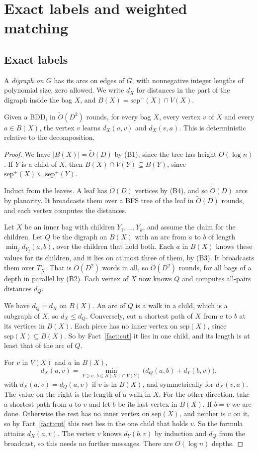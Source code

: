 \documentclass[11pt]{article}
\theoremstyle{definition}
\theoremstyle{remark}
\theoremstyle{plain}
\newenvironment{named}[1]{\def\namedtext{#1}\phantomsection\namedinner}{\endnamedinner}
\newcommand{\Ot}{\tilde O}
\newcommand{\sep}{\mathrm{sep}}
\begin{document}
\section{Exact labels and weighted matching}\label{sec:weighted}

\subsection{Exact labels}

A \emph{digraph on $G$} has its arcs on edges of $G$, with nonnegative integer lengths of polynomial size, zero allowed.
We write $d_X$ for distances in the part of the digraph inside the bag $X$, and $B(X)=\sep^+(X)\cap V(X)$.

\begin{named}{Exact Labels Lemma}\label{lem:labels}
Given a BDD, in $\Ot(D^2)$ rounds, for every bag $X$, every vertex $v$ of $X$ and every $a\in B(X)$, the vertex $v$
learns $d_X(a,v)$ and $d_X(v,a)$. This is deterministic relative to the decomposition.
\end{named}
\begin{proof}
We have $|B(X)|=\Ot(D)$ by (B1), since the tree has height $O(\log n)$. If $Y$ is a child of $X$, then
$B(X)\cap V(Y)\subseteq B(Y)$, since $\sep^+(X)\subseteq\sep^+(Y)$.

Induct from the leaves. A leaf has $\Ot(D)$ vertices by (B4), and so $\Ot(D)$ arcs by planarity. It broadcasts them over a BFS
tree of the leaf in $\Ot(D)$ rounds, and each vertex computes the distances.

Let $X$ be an inner bag with children $Y_1,\dots,Y_k$, and assume the claim for the children. Let $Q$ be the digraph on
$B(X)$ with an arc from $a$ to $b$ of length $\min_jd_{Y_j}(a,b)$, over the children that hold both. Each $a$ in $B(X)$
knows these values for its children, and it lies on at most three of them, by (B3). It broadcasts them over $T_X$. That is
$\Ot(D^2)$ words in all, so $\Ot(D^2)$ rounds, for all bags of a depth in parallel by (B2). Each vertex of $X$ now knows $Q$
and computes all-pairs distances $d_Q$.

We have $d_Q=d_X$ on $B(X)$. An arc of $Q$ is a walk in a child, which is a subgraph of $X$, so $d_X\le d_Q$. Conversely,
cut a shortest path of $X$ from $a$ to $b$ at its vertices in $B(X)$. Each piece has no inner vertex on $\sep(X)$, since
$\sep(X)\subseteq B(X)$. So by Fact~\ref{fact:cut} it lies in one child, and its length is at least that of the arc of $Q$.

For $v$ in $V(X)$ and $a$ in $B(X)$,
\[
d_X(a,v)=\min_{Y\ni v,\ b\in B(X)\cap V(Y)}\bigl(d_Q(a,b)+d_Y(b,v)\bigr),
\]
with $d_X(a,v)=d_Q(a,v)$ if $v$ is in $B(X)$, and symmetrically for $d_X(v,a)$. The value on the right is the length of a walk in
$X$. For the other direction, take a shortest path from $a$ to $v$ and let $b$ be its last vertex in $B(X)$. If $b=v$ we are
done. Otherwise the rest has no inner vertex on $\sep(X)$, and neither is $v$ on it, so by Fact~\ref{fact:cut} this rest lies in
the one child that holds $v$. So the formula attains $d_X(a,v)$. The vertex $v$ knows $d_Y(b,v)$ by induction and $d_Q$ from the
broadcast, so this needs no further messages. There are $O(\log n)$ depths.
\end{proof}
\end{document}
